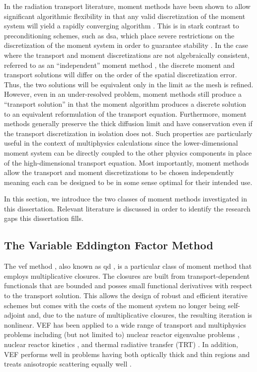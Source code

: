 \documentclass[../doc.tex]{subfiles}
\begin{document}
In the radiation transport literature, moment methods have been shown to allow significant algorithmic flexibility in that any valid discretization of the moment system will yield a rapidly converging algorithm \cite{two-level-independent-warsa}. 
This is in stark contrast to preconditioning schemes, such as \gls{dsa}, which place severe restrictions on the discretization of the moment system in order to guarantee stability \cite{A}. In the case where the transport and moment discretizations are not algebraically consistent, referred to as an ``independent'' moment method \cite{doi:10.1080/00411459308203810,two-level-independent-warsa}, the discrete moment and transport solutions will differ on the order of the spatial discretization error. Thus, the two solutions will be equivalent only in the limit as the mesh is refined. However, even in an under-resolved problem, moment methods still produce a ``transport solution'' in that the moment algorithm produces a discrete solution to an equivalent reformulation of the transport equation. Furthermore, moment methods generally preserve the thick diffusion limit \cite{diflim} and have conservation even if the transport discretization in isolation does not. Such properties are particularly useful in the context of multiphysics calculations since the lower-dimensional moment system can be directly coupled to the other physics components in place of the high-dimensional transport equation. Most importantly, moment methods allow the transport and moment discretizations to be chosen independently meaning each can be designed to be in some sense optimal for their intended use. 

In this section, we introduce the two classes of moment methods investigated in this dissertation. Relevant literature is discussed in order to identify the research gaps this dissertation fills. 

\subsection{The Variable Eddington Factor Method}
The \gls{vef} method \cite{mihalas,auer_vef}, also known as \gls{qd} \cite{goldin}, is a particular class of moment method that employs multiplicative closures. 
The closures are built from transport-dependent functionals that are bounded and posses small functional derivatives with respect to the transport solution. This allows the design of robust and efficient iterative schemes but comes with the costs of the moment system no longer being self-adjoint and, due to the nature of multiplicative closures, the resulting iteration is nonlinear. 
VEF has been applied to a wide range of transport and multiphysics problems including (but not limited to) nuclear reactor eigenvalue problems \cite{airstova_eigenvalue}, nuclear reactor kinetics \cite{doi:10.13182/NSE13-42}, and thermal radiative transfer (TRT) \cite{anistratov1996nonlinear}. In addition, VEF performs well in problems having both optically thick and thin regions and treats anisotropic scattering equally well \cite{anistratov_fvm,ARISTOVA2000139}. 
\end{document}
